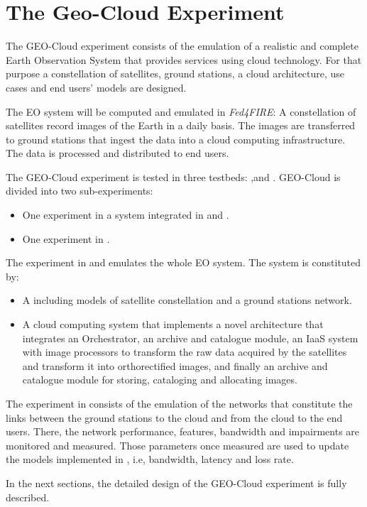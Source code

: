 
\chapter{The Geo-Cloud Experiment}
\label{chap:geocloud-experiment}
The GEO-Cloud experiment consists of the emulation of a realistic and complete Earth Observation System that provides services using cloud technology. For that purpose a constellation of satellites, ground stations, a cloud architecture, use cases and end users' models are designed.

The \ac{EO} system will be computed and emulated in \emph{Fed4FIRE}: A constellation of satellites record images of the Earth in a daily basis. The images are transferred to ground stations that ingest the data into a cloud computing infrastructure. The data is processed and distributed to end users.

The GEO-Cloud experiment is tested in three testbeds: \vw,\bonfire and
\pl. GEO-Cloud is divided into two sub-experiments:
\begin{itemize}
\item One experiment in a system integrated in \vw and \bonfire.
\item One experiment in \pl.
\end{itemize}

The experiment in \vw and \bonfire emulates the whole \ac{EO} system. The system is constituted by:

\begin{itemize}
\item A \sss including models of satellite constellation and a ground stations
  network.
\item A cloud computing system that implements a novel architecture that
  integrates an Orchestrator, an archive and catalogue module, an IaaS system
  with image processors to transform the raw data acquired by the satellites and
  transform it into orthorectified images, and finally an archive and catalogue
  module for storing, cataloging and allocating images.
\end{itemize}

The experiment in \pl consists of the emulation of the networks that constitute
the links between the ground stations to the cloud and from the cloud to the end
users. There, the network performance, features, bandwidth and impairments are
monitored and measured. Those parameters once measured are used to update the
models implemented in \vw, i.e, bandwidth, latency and loss rate.

In the next sections, the detailed design of the GEO-Cloud experiment is fully described.














